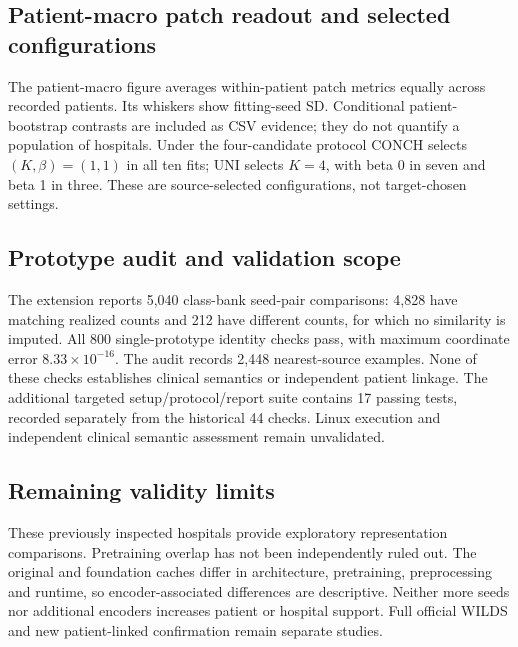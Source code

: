 \documentclass[10pt,letterpaper]{article}
\begin{document}







\clearpage\subsection{Patient-macro patch readout and selected configurations}
The patient-macro figure averages within-patient patch metrics equally across recorded patients. Its whiskers show fitting-seed SD. Conditional patient-bootstrap contrasts are included as CSV evidence; they do not quantify a population of hospitals. Under the four-candidate protocol CONCH selects $(K,\beta)=(1,1)$ in all ten fits; UNI selects $K=4$, with beta 0 in seven and beta 1 in three. These are source-selected configurations, not target-chosen settings.


\subsection{Prototype audit and validation scope}
The extension reports 5,040 class-bank seed-pair comparisons: 4,828 have matching realized counts and 212 have different counts, for which no similarity is imputed. All 800 single-prototype identity checks pass, with maximum coordinate error $8.33\times10^{-16}$. The audit records 2,448 nearest-source examples. None of these checks establishes clinical semantics or independent patient linkage. The additional targeted setup/protocol/report suite contains 17 passing tests, recorded separately from the historical 44 checks. Linux execution and independent clinical semantic assessment remain unvalidated.

\subsection{Remaining validity limits}
These previously inspected hospitals provide exploratory representation comparisons. Pretraining overlap has not been independently ruled out. The original and foundation caches differ in architecture, pretraining, preprocessing and runtime, so encoder-associated differences are descriptive. Neither more seeds nor additional encoders increases patient or hospital support. Full official WILDS and new patient-linked confirmation remain separate studies.
\end{document}
